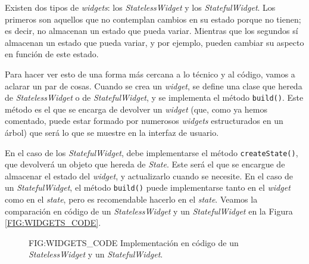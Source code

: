 Existen dos tipos de \textit{widgets}: los \textit{StatelessWidget} y los \textit{StatefulWidget}. Los primeros son aquellos que no contemplan
cambios en su estado porque no tienen; es decir, no almacenan un estado que pueda variar. Mientras que los segundos sí almacenan un estado que pueda
variar, y por ejemplo, pueden cambiar su aspecto en función de este estado.

Para hacer ver esto de una forma más cercana a lo técnico y al código, vamos a aclarar un par de cosas. Cuando se crea un \textit{widget}, se define una clase
que hereda de \textit{StatelessWidget} o de \textit{StatefulWidget}, y se implementa el método \texttt{build()}. Este método es el que se encarga de devolver
un \textit{widget} (que, como ya hemos comentado, puede estar formado por numerosos \textit{widgets} estructurados en un árbol) que será lo que se muestre en 
la interfaz de usuario.

En el caso de los \textit{StatefulWidget}, debe implementarse el método \texttt{createState()}, que devolverá un objeto que hereda de \textit{State}.
Este será el que se encargue de almacenar el estado del \textit{widget}, y actualizarlo cuando se necesite. En el caso de un \textit{StatefulWidget}, el método
\texttt{build()} puede implementarse tanto en el \textit{widget} como en el \textit{state}, pero es recomendable hacerlo en el \textit{state}.
Veamos la comparación en código de un \textit{StatelessWidget} y un \textit{StatefulWidget} en la Figura \ref{FIG:WIDGETS_CODE}.

\begin{figure}[Implementación en código de un \textit{StatelessWidget} y un \textit{StatefulWidget}]{FIG:WIDGETS_CODE}
  {Implementación en código de un \textit{StatelessWidget} y un \textit{StatefulWidget}.}
   \quad
\end{figure}



